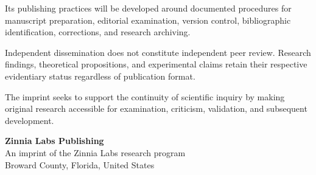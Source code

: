 \noindent Its publishing practices will be developed around documented procedures for manuscript preparation, editorial examination, version control, bibliographic identification, corrections, and research archiving.\par
\vspace{0.05in}

\noindent Independent dissemination does not constitute independent peer review. Research findings, theoretical propositions, and experimental claims retain their respective evidentiary status regardless of publication format.\par
\vspace{0.05in}

\noindent The imprint seeks to support the continuity of scientific inquiry by making original research accessible for examination, criticism, validation, and subsequent development.\par
\vspace{0.15in}

\noindent\textbf{Zinnia Labs Publishing}\\
An imprint of the Zinnia Labs research program\\
Broward County, Florida, United States\par
\endgroup
\clearpage
